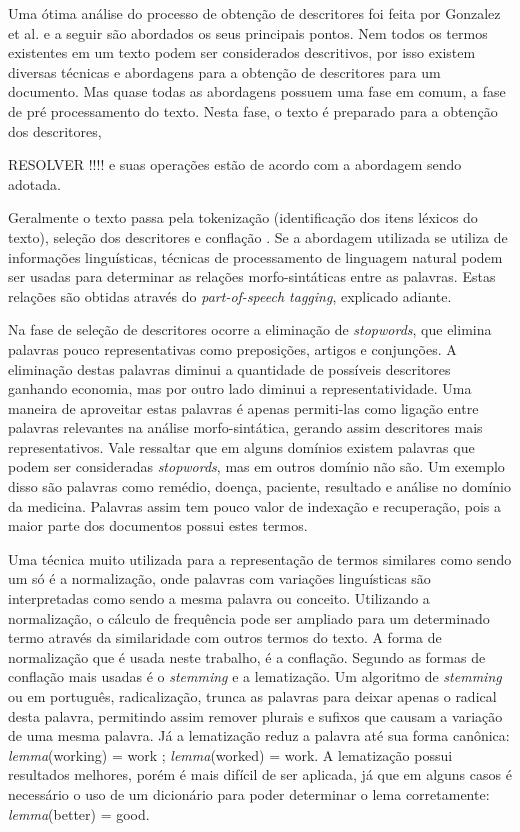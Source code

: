 Uma ótima análise do processo de obtenção de descritores foi feita por Gonzalez et al. \cite{Gonzalez2006} e a seguir são abordados os seus principais pontos. Nem todos os termos existentes em um texto podem ser considerados descritivos, por isso existem diversas técnicas e abordagens para a obtenção de descritores para um documento. Mas quase todas as abordagens possuem uma fase em comum, a fase de pré processamento do texto. Nesta fase, o texto é preparado para a obtenção dos descritores, 

RESOLVER !!!! e suas operações estão de acordo com a abordagem sendo adotada.

 Geralmente o texto passa pela tokenização (identificação dos itens léxicos do texto), seleção dos descritores e conflação \cite{Yates1999}. Se a abordagem utilizada se utiliza de informações linguísticas, técnicas de processamento de linguagem natural podem ser usadas para determinar as relações morfo-sintáticas entre as palavras. Estas relações são obtidas através do \emph{part-of-speech tagging}, explicado adiante.

Na fase de seleção de descritores ocorre a eliminação de \emph{stopwords}, que elimina palavras pouco representativas como preposições, artigos e conjunções. A eliminação destas palavras diminui a quantidade de possíveis descritores ganhando economia, mas por outro lado diminui a representatividade. Uma maneira de aproveitar estas palavras é apenas permiti-las como ligação entre palavras relevantes na análise morfo-sintática, gerando assim descritores mais representativos. Vale ressaltar que em alguns domínios existem palavras que podem ser consideradas \emph{stopwords}, mas em outros domínio não são. Um exemplo disso são palavras como remédio, doença, paciente, resultado e análise no domínio da medicina. Palavras assim tem pouco valor de indexação e recuperação, pois a maior parte dos documentos possui estes termos.

Uma técnica muito utilizada para a representação de termos similares como sendo um só é a normalização, onde palavras com variações linguísticas são interpretadas como sendo a mesma palavra ou conceito. Utilizando a normalização, o cálculo de frequência pode ser ampliado para um determinado termo através da similaridade com outros termos do texto. A forma de normalização que é usada neste trabalho, é a conflação. Segundo \cite{Gonzalez2006} as formas de conflação mais usadas é o \emph{stemming} e a lematização. Um algoritmo de \emph{stemming} ou em português, radicalização, trunca as palavras para deixar apenas o radical desta palavra, permitindo assim remover plurais e sufixos que causam a variação de uma mesma palavra. Já a lematização reduz a palavra até sua forma canônica: \emph{lemma}(working) = work ; \emph{lemma}(worked) = work. A lematização possui resultados melhores, porém é mais difícil de ser aplicada, já que em alguns casos é necessário o uso de um dicionário para poder determinar o lema corretamente: \emph{lemma}(better) = good.

